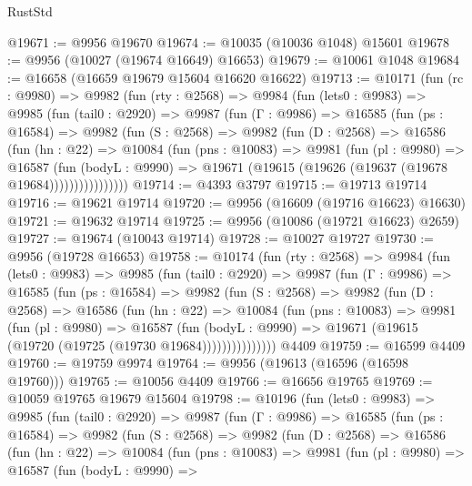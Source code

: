 \begin{lexlean}{RustStd}
\begin{coremodule}
@19671 := @9956 @19670
@19674 := @10035 (@10036 @1048) @15601
@19678 := @9956 (@10027 (@19674 @16649) @16653)
@19679 := @10061 @1048
@19684 := @16658 (@16659 @19679 @15604 @16620 @16622)
@19713 := @10171
    (fun (rc : @9980) =>
    @9982
      (fun (rty : @2568) =>
      @9984
        (fun (lets0 : @9983) =>
        @9985
          (fun (tail0 : @2920) =>
          @9987
            (fun (Γ : @9986) =>
            @16585
              (fun (ps : @16584) =>
              @9982
                (fun (S : @2568) =>
                @9982
                  (fun (D : @2568) =>
                  @16586
                    (fun (hn : @22) =>
                    @10084
                      (fun (pns : @10083) =>
                      @9981
                        (fun (pl : @9980) =>
                        @16587
                          (fun (bodyL : @9990) =>
                          @19671 (@19615 (@19626 (@19637 (@19678 @19684))))))))))))))))
@19714 := @4393 @3797
@19715 := @19713 @19714
@19716 := @19621 @19714
@19720 := @9956 (@16609 (@19716 @16623) @16630)
@19721 := @19632 @19714
@19725 := @9956 (@10086 (@19721 @16623) @2659)
@19727 := @19674 (@10043 @19714)
@19728 := @10027 @19727
@19730 := @9956 (@19728 @16653)
@19758 := @10174
    (fun (rty : @2568) =>
    @9984
      (fun (lets0 : @9983) =>
      @9985
        (fun (tail0 : @2920) =>
        @9987
          (fun (Γ : @9986) =>
          @16585
            (fun (ps : @16584) =>
            @9982
              (fun (S : @2568) =>
              @9982
                (fun (D : @2568) =>
                @16586
                  (fun (hn : @22) =>
                  @10084
                    (fun (pns : @10083) =>
                    @9981
                      (fun (pl : @9980) =>
                      @16587
                        (fun (bodyL : @9990) =>
                        @19671 (@19615 (@19720 (@19725 (@19730 @19684)))))))))))))))
    @4409
@19759 := @16599 @4409
@19760 := @19759 @9974
@19764 := @9956 (@19613 (@16596 (@16598 @19760)))
@19765 := @10056 @4409
@19766 := @16656 @19765
@19769 := @10059 @19765 @19679 @15604
@19798 := @10196
    (fun (lets0 : @9983) =>
    @9985
      (fun (tail0 : @2920) =>
      @9987
        (fun (Γ : @9986) =>
        @16585
          (fun (ps : @16584) =>
          @9982
            (fun (S : @2568) =>
            @9982
              (fun (D : @2568) =>
              @16586
                (fun (hn : @22) =>
                @10084
                  (fun (pns : @10083) =>
                  @9981
                    (fun (pl : @9980) =>
                    @16587
                      (fun (bodyL : @9990) =>

\end{coremodule}
\end{lexlean}
